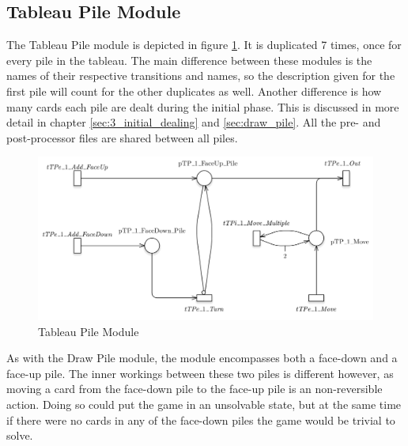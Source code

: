 \documentclass[runningheads,a4paper]{llncs}
\begin{document}
\subsection{Tableau Pile Module}
The Tableau Pile module is depicted in figure \ref{fig:tableau_pile}. It is duplicated 7 times, once for every pile in the tableau. The main difference between these modules is the names of their respective transitions and names, so the description given for the first pile will count for the other duplicates as well. Another difference is how many cards each pile are dealt during the initial phase. This is discussed in more detail in chapter \ref{sec:3_initial_dealing} and \ref{sec:draw_pile}. All the pre- and post-processor files are shared between all piles.
\begin{figure}
	\begin{center}
		\includegraphics[width=\textwidth]{images/tableauPile}
		\caption{Tableau Pile Module}
		\label{fig:tableau_pile}
	\end{center}
\end{figure}

As with the Draw Pile module, the module encompasses both a face-down and a face-up pile. The inner workings between these two piles is different however, as moving a card from the face-down pile to the face-up pile is an non-reversible action. Doing so could put the game in an unsolvable state, but at the same time if there were no cards in any of the face-down piles the game would be trivial to solve. \\
\end{document}
